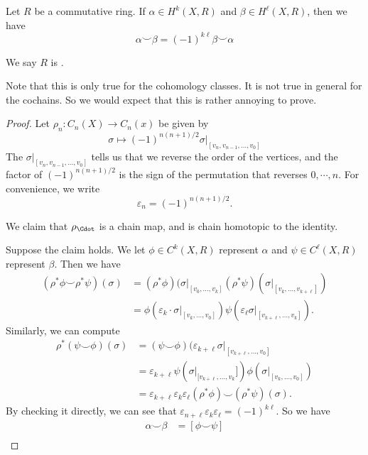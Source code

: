 \documentclass[a4paper]{article}
\begin{document}
\begin{prop}
  Let $R$ be a commutative ring. If $\alpha \in H^k(X, R)$ and $\beta \in H^\ell(X, R)$, then we have
  \[
    \alpha \smile \beta = (-1)^{k\ell}\beta \smile \alpha
  \]
\end{prop}
We say $R$ is .

Note that this is only true for the cohomology classes. It is not true in general for the cochains. So we would expect that this is rather annoying to prove.

\begin{proof}
  Let $\rho_n: C_n(X) \to C_n(x)$ be given by
  \[
    \sigma \mapsto (-1)^{n(n + 1)/2} \sigma|_{[v_n, v_{n - 1}, \ldots, v_0]}
  \]
  The $\sigma|_{[v_n, v_{n - 1}, \ldots, v_0]}$ tells us that we reverse the order of the vertices, and the factor of $(-1)^{n(n + 1)/2}$ is the sign of the permutation that reverses $0, \cdots, n$. For convenience, we write
  \[
    \varepsilon_n = (-1)^{n (n + 1)/2}.
  \]
  \begin{claim}
    We claim that $\rho_{\Cdot}$ is a chain map, and is chain homotopic to the identity.
  \end{claim}
  Suppose the claim holds. We let $\phi \in C^k(X, R)$ represent $\alpha$ and $\psi \in C^\ell(X, R)$ represent $\beta$. Then we have
  \begin{align*}
    (\rho^* \phi \smile \rho^* \psi)(\sigma) &= (\rho^* \phi)(\sigma|_{[v_0, \ldots, v_k]} (\rho^* \psi)(\sigma|_{[v_k, \ldots, v_{k + \ell}]})\\
    &= \phi(\varepsilon_k \cdot \sigma|_{[v_k, \ldots, v_0]}) \psi(\varepsilon_\ell \sigma|_{[v_{k + \ell}, \ldots, v_k]}).
  \end{align*}
  Similarly, we can compute
  \begin{align*}
    \rho^*(\psi \smile \phi)(\sigma) &= (\psi \smile \phi)(\varepsilon_{k + \ell} \sigma|_{[v_{k + \ell}, \ldots, v_0]}\\
    &= \varepsilon_{k + \ell} \psi(\sigma|_{[v_{k + \ell}, \ldots, v_k}]) \phi(\sigma|_{[v_k, \ldots, v_0]})\\
    &= \varepsilon_{k + \ell}\varepsilon_k \varepsilon_\ell (\rho^* \phi) \smile (\rho^* \psi)(\sigma).
  \end{align*}
  By checking it directly, we can see that $\varepsilon_{n + \ell}\varepsilon_k \varepsilon_\ell = (-1)^{k\ell}$. So we have
  \begin{align*}
    \alpha \smile \beta &= [\phi \smile \psi] \\

\end{align*}
\end{proof}
\end{document}
